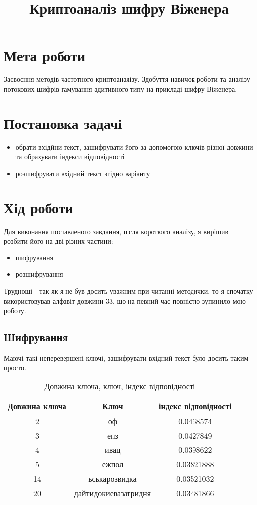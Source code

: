 \documentclass[12pt]{article}
\title{\textbf{Криптоаналіз шифру Віженера}}
\author{}
\date{}
\begin{document}
\maketitle
\section{Мета роботи}
\quad Засвоєння методів частотного криптоаналізу. Здобуття навичок роботи та аналізу потокових шифрів гамування адитивного типу на прикладі шифру Віженера.
    
\section{Постановка задачі}
\begin{itemize}
    \item обрати вхідйни текст, зашифрувати його за допомогою ключів різної довжини та обрахувати індекси відповідності
    \item розшифрувати вхідний текст згідно варіанту
\end{itemize}
    
\section{Хід роботи}
\quad Для виконання поставленого завдання, після короткого аналізу, я вирішив розбити його на дві різних частини: 
\begin{itemize}
    \item шифрування
    \item розшифрування
\end{itemize}
\quad Труднощі - так як я не був досить уважним при читанні методички, то я спочатку використовував алфавіт довжини 33, що на певний час повністю зупинило мою роботу.
    
\newpage
\subsection{Шифрування}
\quad Маючі такі неперевершені ключі, зашифрувати вхідний текст було досить таким просто.
\begin{table}[h]
\centering
\begin{tabular}{ccc}
\toprule
Довжина ключа & Ключ & індекс відповідності \\
\midrule
2 & оф & 0.0468574 \\
3 & енз & 0.0427849 \\
4 & ивац & 0.0398622 \\
5 & ежпол & 0.03821888 \\
14 & ьськарозвидка & 0.03521032 \\
20 & дайтидокиевазатридня & 0.03481866 \\
\bottomrule
\end{tabular}
\caption{Довжина ключа, ключ, індекс відповідності}
\label{tab:my_table}
\end{table}
    
\end{document}
